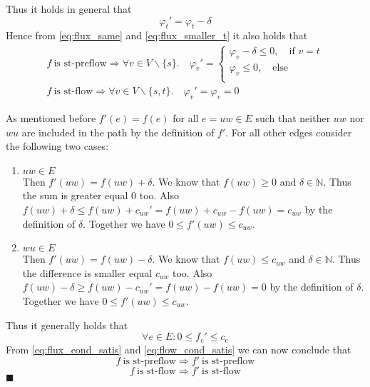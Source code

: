 \documentclass[10pt,a4paper]{article}
\begin{document}
	Thus it holds in general that 
	\begin{equation}
	\label{eq:flux_smaller_t}
	\varphi_t' = \varphi_t - \delta
	\end{equation}
	Hence from \ref{eq:flux_same} and \ref{eq:flux_smaller_t} it also holds that
		\begin{align}
		\label{eq:flux_cond_satis}
		f~\text{is st-preflow} \Rightarrow \forall v \in V \backslash \{s\}. \quad \varphi_v' =
		\begin{cases}
		\varphi_v - \delta \leq 0, \quad \text{if } v=t\\
		\varphi_v \leq 0,  \quad \text{else} \\
		\end{cases} \\
		f~\text{is st-flow} \Rightarrow \forall v \in V \backslash \{s,t\}. \quad  
		\varphi_v' = \varphi_v = 0 
		\end{align}
		
	As mentioned before $f'(e) = f(e)$ for all $e = uw \in E$ such that neither $uw$ nor $wu$ are included in the path by the definition of $f'$. For all other edges consider the following two cases:
	\begin{enumerate}
		\item $uw \in E$ \\
		Then $f'(uw) = f(uw) + \delta$. We know that $f(uw) \geq 0$ and $\delta \in \mathbb{N}$. Thus the sum is greater equal 0 too. Also $f(uw) + \delta \leq f(uw) + c_{uw}' = f(uw) + c_{uw} - f(uw) = c_{uw}$ by the definition of $\delta$. Together we have $0 \leq f'(uw) \leq c_{uw}$.
		
		\item $wu \in E$ \\
		Then $f'(uw) = f(uw) - \delta$. We know that $f(uw) \leq c_{uw}$ and $\delta \in \mathbb{N}$. Thus the difference is smaller equal $c_{uw}$ too. Also $f(uw) - \delta \geq f(uw) - c_{uw}' = f(uw) - f(uw) = 0$ by the definition of $\delta$. Together we have $0 \leq f'(uw) \leq c_{uw}$.
	\end{enumerate}
	Thus it generally holds that
	\begin{equation}
	\label{eq:flow_cond_satis}
	\forall e \in E: 0 \leq f_e' \leq c_e
	\end{equation}
	From \ref{eq:flux_cond_satis} and \ref{eq:flow_cond_satis} we can now conclude that
	$$ f~\text{is st-preflow} \Rightarrow f'~\text{is st-preflow}$$
	$$ f~\text{is st-flow} \Rightarrow f'~\text{is st-flow}$$
	\hfill $\blacksquare$
	
\end{document}

